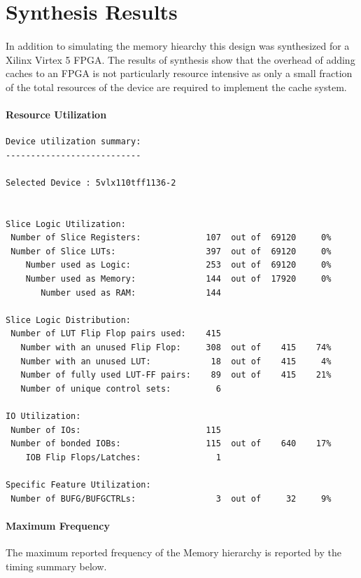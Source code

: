 \documentclass[11pt,letterpaper,]{article}
\begin{document}
\section{ Synthesis Results }
\label{Results:Synthesis}
\paragraph{}
In addition to simulating the memory hiearchy this design was synthesized for a Xilinx Virtex 5 FPGA.  The results of synthesis show that the overhead of adding caches to an FPGA is not particularly resource intensive as only a small fraction of the total resources of the device are required to implement the cache system.
\paragraph{ Resource Utilization }

\begin{verbatim}
Device utilization summary:
---------------------------

Selected Device : 5vlx110tff1136-2 


Slice Logic Utilization: 
 Number of Slice Registers:             107  out of  69120     0%  
 Number of Slice LUTs:                  397  out of  69120     0%  
    Number used as Logic:               253  out of  69120     0%  
    Number used as Memory:              144  out of  17920     0%  
       Number used as RAM:              144

Slice Logic Distribution: 
 Number of LUT Flip Flop pairs used:    415
   Number with an unused Flip Flop:     308  out of    415    74%  
   Number with an unused LUT:            18  out of    415     4%  
   Number of fully used LUT-FF pairs:    89  out of    415    21%  
   Number of unique control sets:         6

IO Utilization: 
 Number of IOs:                         115
 Number of bonded IOBs:                 115  out of    640    17%  
    IOB Flip Flops/Latches:               1

Specific Feature Utilization:
 Number of BUFG/BUFGCTRLs:                3  out of     32     9%  
\end{verbatim}

\paragraph{ Maximum Frequency }
The maximum reported frequency of the Memory hierarchy is reported by the timing summary below.
\end{document}
